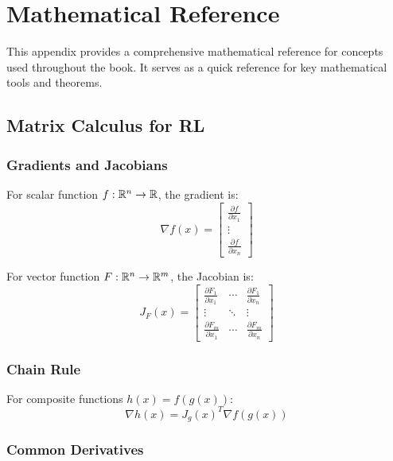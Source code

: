 \chapter{Mathematical Reference}
\label{app:math-reference}

This appendix provides a comprehensive mathematical reference for concepts used throughout the book. It serves as a quick reference for key mathematical tools and theorems.

\section{Matrix Calculus for RL}

\subsection{Gradients and Jacobians}

For scalar function $f: \mathbb{R}^n \to \mathbb{R}$, the gradient is:
\begin{equation}
\nabla f(x) = \begin{bmatrix} \frac{\partial f}{\partial x_1} \\ \vdots \\ \frac{\partial f}{\partial x_n} \end{bmatrix}
\end{equation}

For vector function $F: \mathbb{R}^n \to \mathbb{R}^m$, the Jacobian is:
\begin{equation}
J_F(x) = \begin{bmatrix}
\frac{\partial F_1}{\partial x_1} & \cdots & \frac{\partial F_1}{\partial x_n} \\
\vdots & \ddots & \vdots \\
\frac{\partial F_m}{\partial x_1} & \cdots & \frac{\partial F_m}{\partial x_n}
\end{bmatrix}
\end{equation}

\subsection{Chain Rule}

For composite functions $h(x) = f(g(x))$:
\begin{equation}
\nabla h(x) = J_g(x)^T \nabla f(g(x))
\end{equation}

\subsection{Common Derivatives}

